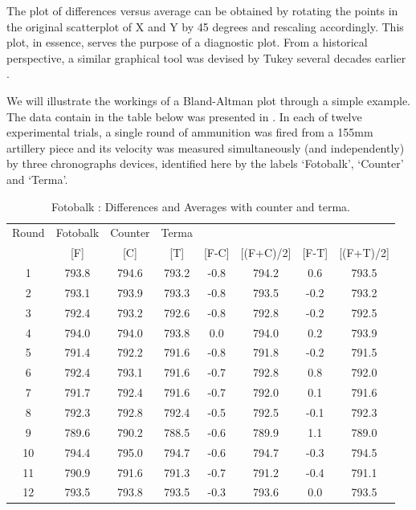 \documentclass[12pt, a4paper]{report}
\theoremstyle{plain}
\theoremstyle{definition}
\theoremstyle{remark}
\begin{document}

The plot of differences versus average can be obtained by rotating the points in the original scatterplot of X and Y by 45 degrees and rescaling accordingly. This plot, in essence, serves the purpose of a diagnostic plot.
From a historical perspective, a similar graphical tool was devised by Tukey several decades earlier \citet{kozak2014including}.

We will illustrate the workings of a Bland-Altman plot through a simple example. The data contain in the table below was presented in \citep{Grubbs48}. In each of twelve experimental trials, a single round of ammunition was fired from a 155mm artillery piece and its velocity was measured simultaneously (and independently) by three chronographs devices, identified here by the labels `Fotobalk', `Counter' and `Terma'.
\begin{table}[h!]
	\renewcommand\arraystretch{0.7}%
	\begin{center}
		\begin{tabular}{|c||c|c|c||c|c|c|c|}
			\hline
			Round & Fotobalk  & Counter & Terma  &   &    &   &   \\
			&  [F] & [C] & [T] &[F-C] &  [(F+C)/2] & [F-T] &  [(F+T)/2] \\
			\hline
			1 & 793.8 & 794.6 & 793.2 & -0.8 & 794.2 & 0.6 & 793.5 \\
			2 & 793.1 & 793.9 & 793.3 & -0.8 & 793.5 & -0.2 & 793.2 \\
			3 & 792.4 & 793.2 & 792.6 & -0.8 & 792.8 & -0.2 & 792.5 \\
			4 & 794.0 & 794.0 & 793.8 & 0.0 & 794.0 & 0.2 & 793.9 \\
			5 & 791.4 & 792.2 & 791.6 & -0.8 & 791.8 & -0.2 & 791.5 \\
			6 & 792.4 & 793.1 & 791.6 & -0.7 & 792.8 & 0.8 & 792.0 \\
			7 & 791.7 & 792.4 & 791.6 & -0.7 & 792.0 & 0.1 & 791.6 \\
			8 & 792.3 & 792.8 & 792.4 & -0.5 & 792.5 & -0.1 & 792.3 \\
			9 & 789.6 & 790.2 & 788.5 & -0.6 & 789.9 & 1.1 & 789.0 \\
			10 & 794.4 & 795.0 & 794.7 & -0.6 & 794.7 & -0.3 & 794.5 \\
			11 & 790.9 & 791.6 & 791.3 & -0.7 & 791.2 & -0.4 & 791.1 \\
			12 & 793.5 & 793.8 & 793.5 & -0.3 & 793.6 & 0.0 & 793.5 \\
			\hline
		\end{tabular}
		\caption{Fotobalk : Differences and Averages with counter and terma.}
		\label{GrubbsData1}
	\end{center}
\end{table}
\end{document}
